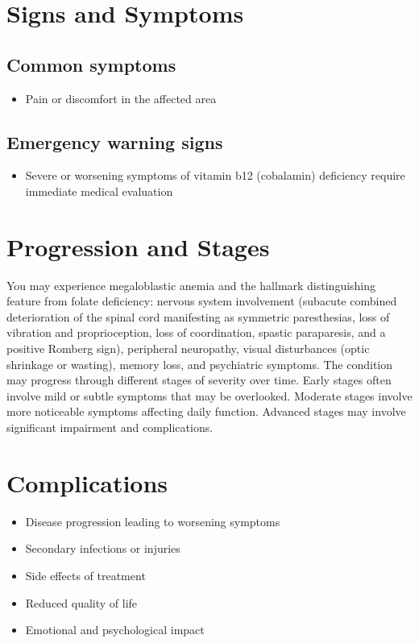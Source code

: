 \section{Signs and Symptoms}

\subsection{Common symptoms}
\begin{itemize}[noitemsep]
  \item Pain or discomfort in the affected area
  \end{itemize}

\subsection{Emergency warning signs}
\begin{itemize}[noitemsep]
  \item Severe or worsening symptoms of vitamin b12 (cobalamin) deficiency require immediate medical evaluation
\end{itemize}
\section{Progression and Stages}
You may experience megaloblastic anemia and the hallmark distinguishing feature from folate deficiency: nervous system involvement (subacute combined deterioration of the spinal cord manifesting as symmetric paresthesias, loss of vibration and proprioception, loss of coordination, spastic paraparesis, and a positive Romberg sign), peripheral neuropathy, visual disturbances (optic shrinkage or wasting), memory loss, and psychiatric symptoms. The condition may progress through different stages of severity over time. Early stages often involve mild or subtle symptoms that may be overlooked. Moderate stages involve more noticeable symptoms affecting daily function. Advanced stages may involve significant impairment and complications.
\section{Complications}
\begin{itemize}[noitemsep]
  \item Disease progression leading to worsening symptoms
  \item Secondary infections or injuries
  \item Side effects of treatment
  \item Reduced quality of life
  \item Emotional and psychological impact
\end{itemize}
